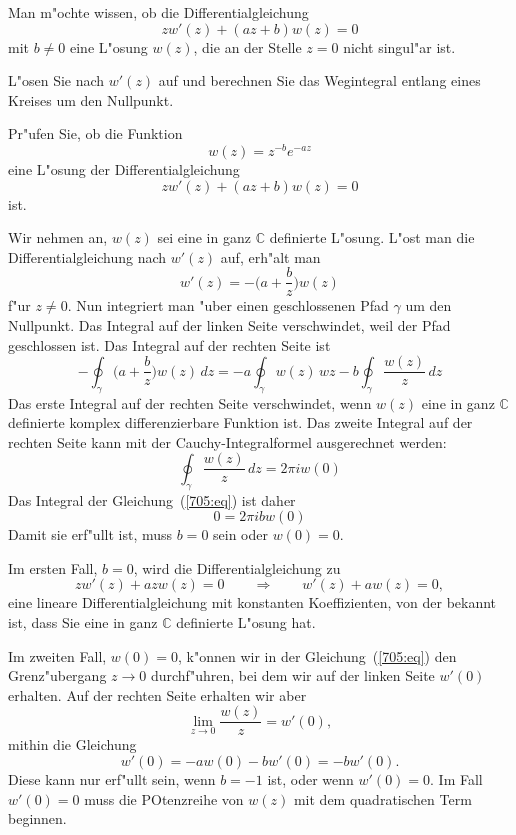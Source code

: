 Man m"ochte wissen, ob die Differentialgleichung
\[
zw'(z)+(az+b)w(z)=0
\]
mit $b\ne 0$ eine L"osung $w(z)$, die an der Stelle $z=0$
nicht singul"ar ist.

\begin{hinweis}
L"osen Sie nach $w'(z)$ auf und berechnen Sie das Wegintegral
entlang eines Kreises um den Nullpunkt.
\end{hinweis}

Pr"ufen Sie, ob die Funktion
\[
w(z) = z^{-b}e^{-az}
\]
eine L"osung der Differentialgleichung
\[
zw'(z)+(az+b)w(z)=0
\]
ist.

\begin{loesung}
Wir nehmen an, $w(z)$ sei eine in ganz $\mathbb C$ definierte L"osung.
L"ost man die Differentialgleichung nach $w'(z)$ auf, erh"alt man
\begin{equation}
w'(z) = -\biggl(a+\frac{b}z\biggr)w(z)
\label{705:eq}
\end{equation}
f"ur $z\ne 0$.
Nun integriert man "uber einen geschlossenen Pfad $\gamma$ um den 
Nullpunkt.
Das Integral auf der linken Seite verschwindet, weil der Pfad geschlossen
ist.
Das Integral auf der rechten Seite ist 
\[
-\oint_\gamma 
\biggl(a+\frac{b}z\biggr)w(z)\,dz
=
-a\oint_\gamma w(z)\,wz
-
b\oint_\gamma \frac{w(z)}z\,dz
\]
Das erste Integral auf der rechten Seite verschwindet, wenn $w(z)$ eine
in ganz $\mathbb C$ definierte komplex differenzierbare Funktion ist.
Das zweite Integral auf der rechten Seite kann mit der Cauchy-Integralformel
ausgerechnet werden:
\[
\oint_\gamma \frac{w(z)}z\,dz
=
2\pi i w(0)
\]
Das Integral der Gleichung~(\ref{705:eq}) ist daher
\[
0=2\pi i b w(0)
\]
Damit sie erf"ullt ist, muss $b=0$ sein oder $w(0)=0$.

Im ersten Fall, $b=0$, wird die Differentialgleichung zu
\[
zw'(z)+azw(z)=0
\qquad\Rightarrow\qquad
w'(z)+aw(z)=0,
\]
eine lineare Differentialgleichung mit konstanten Koeffizienten, von der
bekannt ist, dass Sie eine in ganz $\mathbb C$ definierte L"osung hat.

Im zweiten Fall, $w(0)=0$, k"onnen wir in der Gleichung~(\ref{705:eq}) 
den Grenz"ubergang $z\to 0$ durchf"uhren, bei dem wir auf der
linken Seite $w'(0)$ erhalten.
Auf der rechten Seite erhalten wir aber
\[
 \lim_{z\to 0}\frac{w(z)}{z}=w'(0),
\]
mithin die Gleichung
\[
w'(0)=-aw(0)-bw'(0)=-bw'(0).
\]
Diese kann nur erf"ullt sein, wenn $b=-1$ ist, oder wenn $w'(0)=0$.
Im Fall $w'(0)=0$ muss die POtenzreihe von $w(z)$ mit dem quadratischen
Term beginnen.
\end{loesung}

